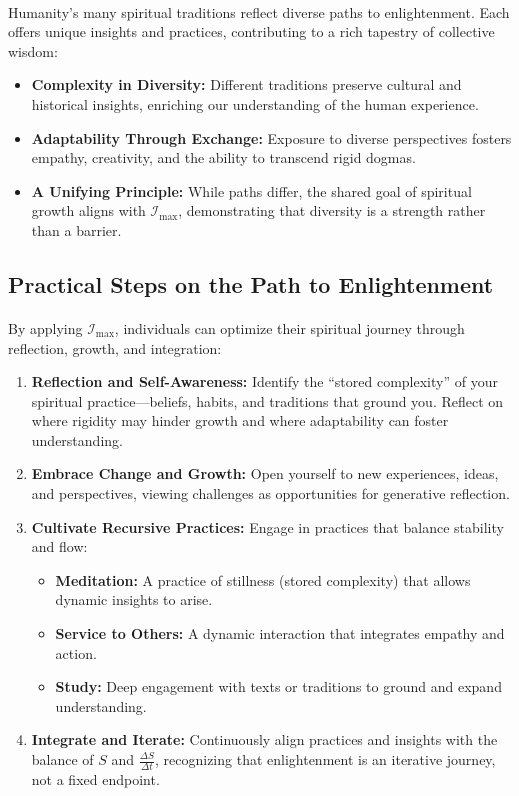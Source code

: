 \documentclass[12pt]{article}
\begin{document}
\paragraph{}
Humanity’s many spiritual traditions reflect diverse paths to enlightenment. Each offers unique insights and practices, contributing to a rich tapestry of collective wisdom:
\begin{itemize}
    \item \textbf{Complexity in Diversity:} Different traditions preserve cultural and historical insights, enriching our understanding of the human experience.
    \item \textbf{Adaptability Through Exchange:} Exposure to diverse perspectives fosters empathy, creativity, and the ability to transcend rigid dogmas.
    \item \textbf{A Unifying Principle:} While paths differ, the shared goal of spiritual growth aligns with \(\mathcal{I}_{\text{max}}\), demonstrating that diversity is a strength rather than a barrier.
\end{itemize}

\subsection{Practical Steps on the Path to Enlightenment}
\paragraph{}
By applying \(\mathcal{I}_{\text{max}}\), individuals can optimize their spiritual journey through reflection, growth, and integration:
\begin{enumerate}
    \item \textbf{Reflection and Self-Awareness:} Identify the “stored complexity” of your spiritual practice—beliefs, habits, and traditions that ground you. Reflect on where rigidity may hinder growth and where adaptability can foster understanding.
    \item \textbf{Embrace Change and Growth:} Open yourself to new experiences, ideas, and perspectives, viewing challenges as opportunities for generative reflection.
    \item \textbf{Cultivate Recursive Practices:} Engage in practices that balance stability and flow:
        \begin{itemize}
            \item \textbf{Meditation:} A practice of stillness (stored complexity) that allows dynamic insights to arise.
            \item \textbf{Service to Others:} A dynamic interaction that integrates empathy and action.
            \item \textbf{Study:} Deep engagement with texts or traditions to ground and expand understanding.
        \end{itemize}
    \item \textbf{Integrate and Iterate:} Continuously align practices and insights with the balance of \(S\) and \(\frac{\Delta S}{\Delta t}\), recognizing that enlightenment is an iterative journey, not a fixed endpoint.
\end{enumerate}
\end{document}
